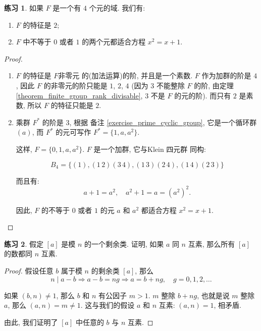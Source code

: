 \documentclass[utf8]{ctexbook}
\theoremstyle{definition}
\newtheorem{exercise}{练习}[section]
\begin{document}
\begin{exercise}
如果 $F$ 是一个有  $4$ 个元的域. 我们有:
\begin{enumerate}
\item{$F$ 的特征是 $2$;}
\item{$F$ 中不等于 $0$ 或者 $1$ 的两个元都适合方程 $x^2 = x + 1 $.}
\end{enumerate}
\end{exercise}

\begin{proof}
\begin{enumerate}
\item{$F$ 的特征是 $F$非零元 的(加法运算)的阶, 并且是一个素数. $F$ 作为加群的阶是 $4$, 因此 $F$ 的非零元的阶只能是 $1$, $2$, $4$ (因为 $3$ 不能整除 $F$ 的阶, 由定理 \ref{theorem_finite_group_rank_divisable}, $3$ 不是 $F$ 的元的阶). 而只有 $2$ 是素数, 所以 $F$ 的特征只能是 $2$.}
\item{乘群 $F^*$ 的阶是 $3$, 根据 备注 \ref{exercise_prime_cyclic_group}, 它是一个循环群 $(a)$, 而 $F^*$ 的元可写作 $F^* = \{1, a, a^2 \}$.

这样, $F = \{0, 1, a, a^2 \}$. $F$ 是一个加群, 它与Klein 四元群 同构:

$$B_4 = \{ (1), (1\, 2)(3 \, 4), (1\, 3)(2 \, 4), (1\, 4) (2 \, 3) \} $$

而且有:
\begin{equation}
a + 1 = a^2, \quad a^2 + 1 = a = (a^2)^2.
\end{equation}

因此, $F$ 的不等于 $0$ 或者 $1$ 的元 $a$ 和 $a^2$ 都适合方程 $x^2 = x+ 1 $. 
}
\end{enumerate}
\end{proof}


\begin{exercise}
假定 $[a]$ 是模 $n$ 的一个剩余类. 证明, 如果 $a$ 同 $n$ 互素, 那么所有 $[a]$ 的数都同 $n$ 互素.
\end{exercise}

\begin{proof}
假设任意 $b$ 属于模 $n$ 的剩余类 $[a]$, 那么
\begin{equation}
n \mid a - b \Rightarrow  a - b = n g \Rightarrow a = b + n g , \quad g = 0, 1, 2, \ldots
\end{equation}

如果 $(b, n) \neq 1$, 那么 $b$ 和 $n$ 有公因子 $m > 1 $. $m$ 整除 $b +ng$, 也就是说 $m$ 整除 $a$, 那么 $(a, n ) = m \neq 1$. 这与我们的假设 $a$ 和 $n$ 互素: $(a,n) = 1$, 相矛盾. 

由此, 我们证明了 $[a]$ 中任意的 $b$ 与 $n$ 互素.

\end{proof}
\end{document}
